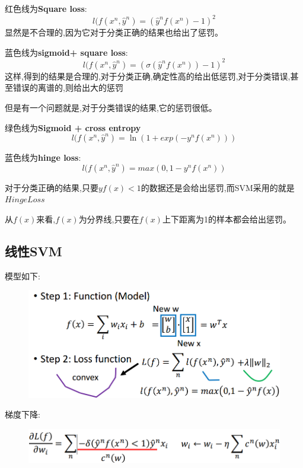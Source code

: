 \documentclass[UTF8,a4paper]{ctexart}
\begin{document}
    红色线为\textbf{Square loss}:
    \begin{equation}
        l(f(x^n , \hat y^n) = (\hat y^n f(x^n) - 1)^2
    \end{equation}
    显然是不合理的,因为它对于分类正确的结果也给出了惩罚。

    蓝色线为\textbf{sigmoid+ square loss}:
    \begin{equation}
        l(f(x^n , \hat y^n) = (\sigma(\hat y^n f(x^n)) - 1)^2
    \end{equation}
    这样,得到的结果是合理的,对于分类正确,确定性高的给出低惩罚,对于分类错误,甚至错误的离谱的,则给出大的惩罚

    但是有一个问题就是,对于分类错误的结果,它的惩罚很低。

    绿色线为\textbf{Sigmoid + cross entropy}
    \begin{equation}
        l(f(x^n , \hat y^n) = \ln(1 + exp(-y^n f(x^n)))
    \end{equation}

    蓝色线为\textbf{hinge loss}:
    \begin{equation}
        l(f(x^n , \hat y^n) = max(0, 1 - y^n f(x^n))
    \end{equation}

    对于分类正确的结果,只要$yf(x) < 1$的数据还是会给出惩罚,而SVM采用的就是$Hinge Loss$

    从$f(x)$来看,$f(x)$为分界线,只要在$f(x)$上下距离为1的样本都会给出惩罚。

        \subsection{线性SVM}
        模型如下:
        \begin{figure}[H]
            \centering
            \includegraphics[scale = 0.3]{assets/ML_2f26e.png}
            \label{figlinearSVM}
        \end{figure}

        梯度下降:
        \begin{figure}[H]
            \centering
            \includegraphics[scale = 0.3]{assets/ML_b932f.png}
            \label{figlinearSVMGradientDescent}
        \end{figure}
\end{document}
